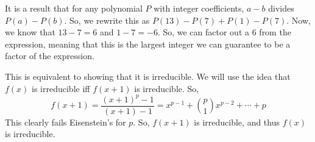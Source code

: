 \documentclass{report}
\begin{document}
\sol It is a result that for any polynomial $P$ with integer coefficients, $a - b$ divides $P(a) - P(b)$. So, we rewrite this as $P(13) - P(7) + P(1) - P(7)$. Now, we know that $13 - 7 = 6$ and $1 - 7 = -6$. So, we can factor out a $6$ from the expression, meaning that this is the largest integer we can guarantee to be a factor of the expression.

\sol This is equivalent to showing that it is irreducible. We will use the idea that $f(x)$ is irreducible iff $f(x+1)$ is irreducible. So, 
$$f(x+1) = \frac{(x+1)^p - 1}{(x+1) - 1} = x^{p-1} + \binom{p}{1}x^{p-2} + \cdots + p$$ 
This clearly fails Eisenstein's for $p$. So, $f(x+1)$ is irreducible, and thus $f(x)$ is irreducible.
\end{document}
